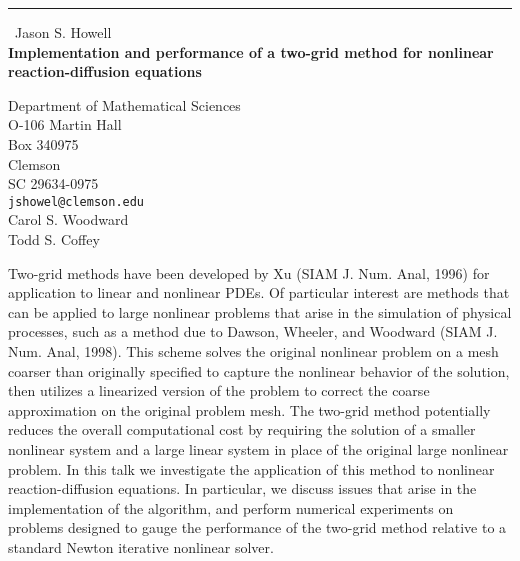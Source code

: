 \documentclass{report}
\begin{document}
\begin{center}
\rule{6in}{1pt} \
{\large Jason S. Howell \\
{\bf Implementation and performance of a two-grid method for nonlinear reaction-diffusion equations}}

Department of Mathematical Sciences \\ O-106 Martin Hall \\ Box 340975 \\ Clemson \\ SC 29634-0975
\\
{\tt jshowel@clemson.edu}\\
Carol S. Woodward\\
Todd S. Coffey\end{center}

Two-grid methods have been developed by Xu (SIAM J. Num. Anal, 1996) for
application to linear and nonlinear PDEs. Of particular interest are
methods that can be applied to large nonlinear problems that arise in the
simulation of physical processes, such as a method due to Dawson,
Wheeler, and Woodward (SIAM J. Num. Anal, 1998). This scheme solves the
original nonlinear problem on a mesh coarser than originally specified to
capture the nonlinear behavior of the solution, then utilizes a
linearized version of the problem to correct the coarse approximation on
the original problem mesh. The two-grid method potentially reduces the
overall computational cost by requiring the solution of a smaller
nonlinear system and a large linear system in place of the original large
nonlinear problem. In this talk we investigate the application of this
method to nonlinear reaction-diffusion equations. In particular, we
discuss issues that arise in the implementation of the algorithm, and
perform numerical experiments on problems designed to gauge the
performance of the two-grid method relative to a standard Newton
iterative nonlinear solver.
\end{document}
